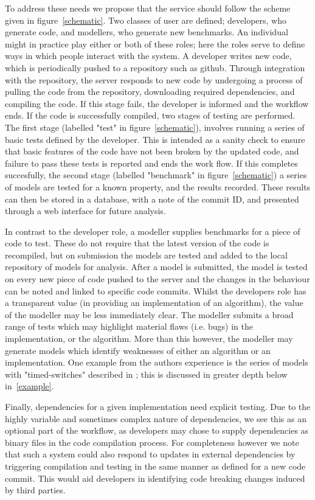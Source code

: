 \documentclass{llncs}
\begin{document}
To address these needs we propose that the service should follow the scheme given in 
figure~\ref{schematic}. Two classes of user are defined; developers, who generate code, 
and modellers, who generate new benchmarks. An individual might in practice play either
or both of these roles; here the roles serve to define ways in which people interact with
the system. A developer writes new code, which is periodically pushed to a repository 
such as github. Through integration with the repository, the server responds to new 
code by undergoing a process of pulling the code from the repository, downloading 
required dependencies, and compiling the code. If this stage fails, the developer is 
informed and the workflow ends. If the code is successfully compiled, two stages of 
testing are performed. The first stage (labelled "test" in figure~\ref{schematic}), involves
running a series of basic tests defined by the developer. This is intended as a sanity check 
to ensure that basic features of the code have not been broken by the updated code, and 
failure to pass these tests is reported and ends the work flow. If this completes succesfully,
the second stage (labelled "benchmark" in figure~\ref{schematic}) a series of models are 
tested for a known property, and the results recorded. These results can then be stored
in a database, with a note of the commit ID, and presented through a web interface for 
future analysis. 

In contrast to the developer role, a modeller supplies benchmarks for a piece of code 
to test. These do not require that the latest version of the code is recompiled, but 
on submission the models are tested and added to the local repository of models for
analysis. After a model is submitted, the model is tested on every new piece of code
pushed to the server and the changes in the behaviour can be noted and linked to 
specific code commits. Whilst the developers role has a transparent value (in 
providing an implementation of an algorithm), the value of the modeller may be less 
immediately clear. The modeller submits a broad range of tests which may highlight
material flaws (i.e. bugs) in the implementation, or the algorithm. More than this
however, the modeller may generate models which identify weaknesses of either an
algorithm or an implementation. One example from the authors experience is the 
series of models with "timed-switches" described in \cite{cook2014}; this is discussed 
in greater depth below in~\ref{example}.

Finally, dependencies for a given implementation need explicit testing. Due to the
highly variable and sometimes complex nature of dependencies, we see this as an
optional part of the workflow, as developers may chose to supply dependencies as
binary files in the code compilation process. For completeness however we note that 
such a system could also respond to updates in external dependencies by triggering 
compilation and testing in the same manner as defined for a new code commit. This 
would aid developers in identifying code breaking changes induced by third parties.
\end{document}
